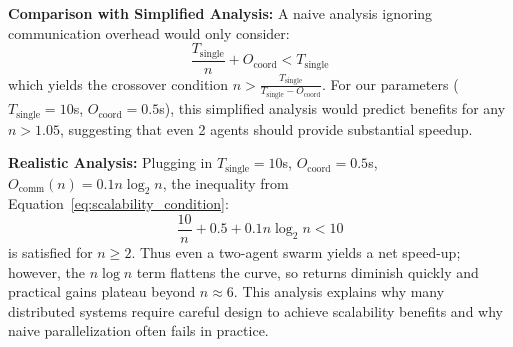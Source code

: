 \documentclass{article}
\begin{document}
\textbf{Comparison with Simplified Analysis:} A naive analysis ignoring communication overhead would only consider:
\begin{equation}
\label{eq:simplified_condition}
\frac{T_{\text{single}}}{n} + O_{\text{coord}} < T_{\text{single}}
\end{equation}
which yields the crossover condition $n > \frac{T_{\text{single}}}{T_{\text{single}} - O_{\text{coord}}}$. For our parameters ($T_{\text{single}} = 10$s, $O_{\text{coord}} = 0.5$s), this simplified analysis would predict benefits for any $n > 1.05$, suggesting that even 2 agents should provide substantial speedup.

\textbf{Realistic Analysis:} Plugging in $T_{\text{single}} = 10$s, $O_{\text{coord}} = 0.5$s, $O_{\text{comm}}(n) = 0.1 n \log_2 n$, the inequality from Equation~\ref{eq:scalability_condition}:
\begin{equation}
\label{eq:realistic_condition}
\frac{10}{n} + 0.5 + 0.1 n \log_2 n < 10
\end{equation}
is satisfied for $n \geq 2$. Thus even a two-agent swarm yields a net speed-up; however, the $n \log n$ term flattens the curve, so returns diminish quickly and practical gains plateau beyond $n \approx 6$. This analysis explains why many distributed systems require careful design to achieve scalability benefits and why naive parallelization often fails in practice.
\end{document}
